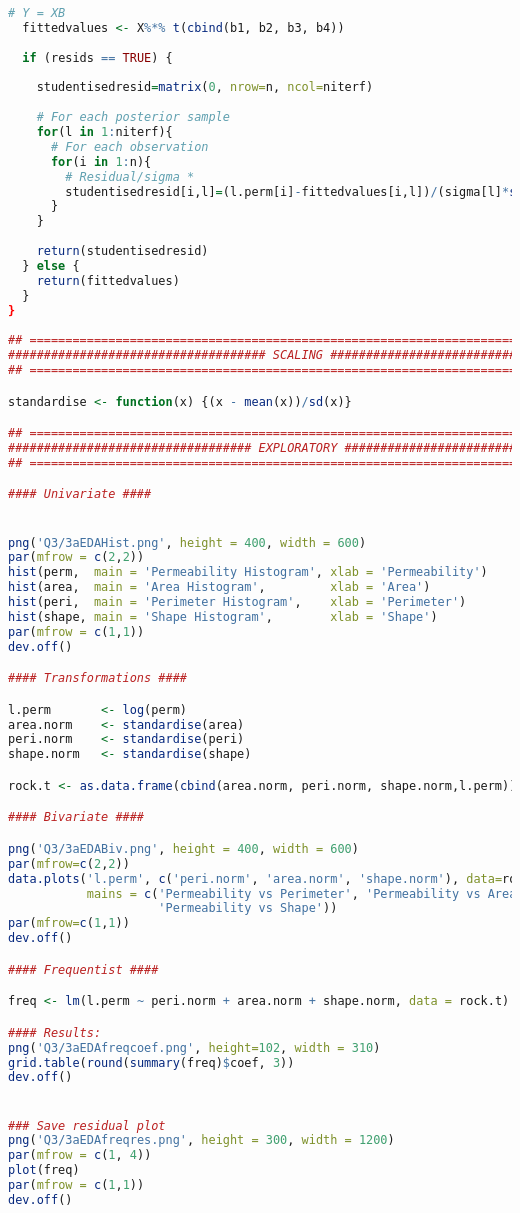 \documentclass{article}
\begin{document}
\begin{lstlisting}[language=R]
  # Y = XB
  fittedvalues <- X%*% t(cbind(b1, b2, b3, b4))
  
  if (resids == TRUE) {
    
    studentisedresid=matrix(0, nrow=n, ncol=niterf)
    
    # For each posterior sample
    for(l in 1:niterf){
      # For each observation
      for(i in 1:n){
        # Residual/sigma * 
        studentisedresid[i,l]=(l.perm[i]-fittedvalues[i,l])/(sigma[l]*sqrt((1-diag(H)[i])))
      }
    }
    
    return(studentisedresid)
  } else {
    return(fittedvalues)
  }
}
  
## ===========================================================================##
#################################### SCALING ###################################
## ===========================================================================##

standardise <- function(x) {(x - mean(x))/sd(x)}

## ===========================================================================##
################################## EXPLORATORY #################################
## ===========================================================================##

#### Univariate ####


png('Q3/3aEDAHist.png', height = 400, width = 600)
par(mfrow = c(2,2))
hist(perm,  main = 'Permeability Histogram', xlab = 'Permeability')
hist(area,  main = 'Area Histogram',         xlab = 'Area')
hist(peri,  main = 'Perimeter Histogram',    xlab = 'Perimeter')
hist(shape, main = 'Shape Histogram',        xlab = 'Shape')
par(mfrow = c(1,1))
dev.off()

#### Transformations ####

l.perm       <- log(perm)
area.norm    <- standardise(area)
peri.norm    <- standardise(peri)
shape.norm   <- standardise(shape)

rock.t <- as.data.frame(cbind(area.norm, peri.norm, shape.norm,l.perm))

#### Bivariate ####

png('Q3/3aEDABiv.png', height = 400, width = 600)
par(mfrow=c(2,2))
data.plots('l.perm', c('peri.norm', 'area.norm', 'shape.norm'), data=rock.t, 
           mains = c('Permeability vs Perimeter', 'Permeability vs Area', 
                     'Permeability vs Shape'))
par(mfrow=c(1,1))
dev.off()

#### Frequentist ####

freq <- lm(l.perm ~ peri.norm + area.norm + shape.norm, data = rock.t)

#### Results:
png('Q3/3aEDAfreqcoef.png', height=102, width = 310)
grid.table(round(summary(freq)$coef, 3))
dev.off()


### Save residual plot
png('Q3/3aEDAfreqres.png', height = 300, width = 1200)
par(mfrow = c(1, 4))
plot(freq)
par(mfrow = c(1,1))
dev.off()

\end{lstlisting}
\end{document}
